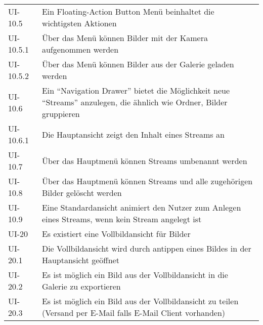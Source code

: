 \begin{center}
\begin{longtable}{|l|p{12cm}|}
UI-10.5 &  Ein Floating-Action Button Menü beinhaltet die wichtigsten Aktionen\\
UI-10.5.1 &  Über das Menü können Bilder mit der Kamera aufgenommen werden\\
UI-10.5.2 &  Über das Menü können Bilder aus der Galerie geladen werden\\
UI-10.6 & Ein \enquote{Navigation Drawer} bietet die Möglichkeit neue \enquote{Streams} anzulegen, die ähnlich wie Ordner, Bilder gruppieren\\
UI-10.6.1 & Die Hauptansicht zeigt den Inhalt eines Streams an\\
UI-10.7 & Über das Hauptmenü können Streams umbenannt werden\\
UI-10.8 & Über das Hauptmenü können Streams und alle zugehörigen Bilder gelöscht werden\\
UI-10.9 & Eine Standardansicht animiert den Nutzer zum Anlegen eines Streams, wenn kein Stream angelegt ist\\
\hline
UI-20 &  Es existiert eine Vollbildansicht für Bilder\\
UI-20.1 & Die Vollbildansicht wird durch antippen eines Bildes in der Hauptansicht geöffnet\\
UI-20.2 & Es ist möglich ein Bild aus der Vollbildansicht in die Galerie zu exportieren\\
UI-20.3 & Es ist möglich ein Bild aus der Vollbildansicht zu teilen (Versand per E-Mail falls E-Mail Client vorhanden)\\
\hline
\end{longtable}
\end{center}

